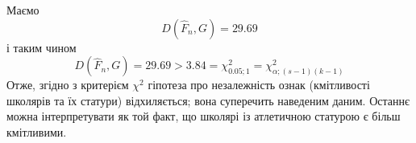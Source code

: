 \documentclass[12pt]{article} %
\newtheorem{prob}{Завдання}
\begin{document}
	Маємо
	\[D(\hat{F}_n,G)=29.69\]
	і таким чином
	\[D(\hat{F}_n,G)=29.69>3.84=\chi^2_{0.05;1}=\chi^2_{\alpha;(s-1)(k-1)}\]
	Отже, згідно з критерієм $\chi^2$ гіпотеза про незалежність ознак (кмітливості школярів та їх статури) відхиляється; вона
	суперечить наведеним даним. Останнє можна інтерпретувати як той факт, що школярі із атлетичною статурою є більш кмітливими.
\begin{comment}
\begin{prob}\end{prob}%
	Нижче наведено результати підкидання грального кубика тисячу разів.
	\begin{center}\begin{tabular}{|c|c|c|c|c|c|}
		\hline
		1&2&3&4&5&6\\\hline
		148&159&180&164&182&167\\\hline
	\end{tabular}\end{center}
	Результати 1000 підкидань можна розглядати як реалізацію вибірки обсягом 1000 з деякого дискретного на множині $\mycbra{1,2,
	\hdots,6}$
	розподілу $F$. Щодо
	розподілу $F$ випадкової величини $\xi$ (показів годинників) висувається гіпотеза $H_0:F$ є
	рівномірним розподілом на множині $\mycbra{1,2,\hdots,6}$,
	тобто щільність $f(x)$ розподілу $F$ має вигляд
	\[f(x)=\left\{\begin{array}{cr}1/6,&\mbox{якщо }x\in\mycbra{1,2,\hdots,6};\\0,&\mbox{якщо }x\notin\mycbra{1,2,\hdots,6};
	\end{array}\right.\]
	Для перевірки гіпотези скористаємось критерієм $\chi^2$. Поділимо множину можливих значень $X=\mycbra{1,2,\hdots,6}$
	випадкової величини $\xi$ на
	неперетинні підмножини $X_i=\mycbra{i},\;i=1,2,\hdots,6$. Імовірність потрапляння $\xi$ в кожну з цих множин
	\[p_i=P\mycbra{\xi=i}=\frac{1}{6}\]
	причому
	\[np_i=1000\frac{1}{6}=166.67>10;\quad i=1,2,\hdots,6.\]
	Отже, користуватися критерієм $\chi^2$ можна.

	Обчислимо значення відхилення між емпіричним розподілом $\hat{F}_n$ та гіпотетичним $G$:
	\[D(\hat{F}_n,G)=\sum_{i=1}^r\frac{\mybra{\nu_i-np_i}^2}{np_i}=4.964;\]
	\[D(\hat{F}_n,G)=4.964<11.07=\chi_{0.05;5}^2=\chi^2_{\alpha;(r-1)}.\]
	Тому згідно з критерієм $\chi^2$, гіпотеза про рівномірний на множині $\mycbra{1,2,\hdots,6}$
	розподіл випадкової величини $\xi$ -- результату підкидання грального кубіка
	 -- не відхиляється. Дані таблиці характерні для вибірки обсягом 1000 з рівномірного на відрізку $\mycbra{1,2,\hdots,6}$
	розподілу. Припущення про те, що результати підкидання розподілені рівномірно на цій множині, не суперечать спостереженням.
	\end{comment}
\end{document}

